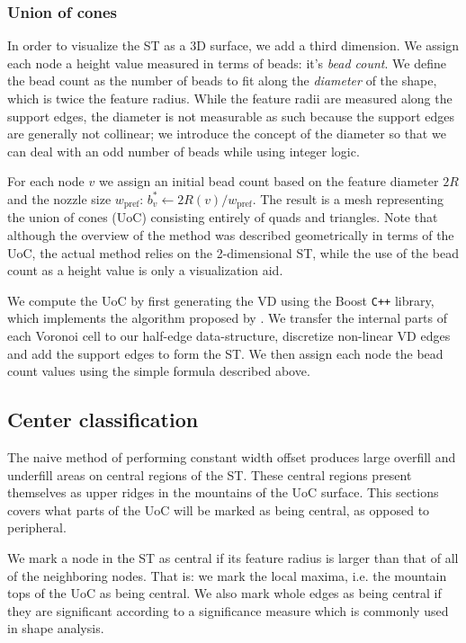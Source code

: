 \subsubsection{Union of cones}
In order to visualize the ST as a 3D surface, we add a third dimension.
We assign each node a height value measured in terms of beads: it's \emph{bead count}.
We define the bead count as the number of beads to fit along the \emph{diameter} of the shape, which is twice the feature radius.
While the feature radii are measured along the support edges, the diameter is not measurable as such because the support edges are generally not collinear;
we introduce the concept of the diameter so that we can deal with an odd number of beads while using integer logic.

For each node $v$ we assign an initial bead count based on the feature diameter $2R$ and the nozzle size $w_\text{pref}$: $b^*_v \leftarrow 2 R(v) / w_\text{pref}$.
The result is a mesh representing the union of cones (UoC) consisting entirely of quads and triangles.
Note that although the overview of the method was described geometrically in terms of the UoC, the actual method relies on the 2-dimensional ST, while the use of the bead count as a height value is only a visualization aid.

We compute the UoC by first generating the VD using the Boost \verb!C++! library, which implements the algorithm proposed by \citeauthor{fortune1986sascg}.\cite{fortune1986sascg}
We transfer the internal parts of each Voronoi cell to our half-edge data-structure, discretize non-linear VD edges and add the support edges to form the ST.
We then assign each node the bead count values using the simple formula described above.












\subsection{Center classification}\label{sec_center_classification}
The naive method of performing constant width offset produces large overfill and underfill areas on central regions of the ST.
These central regions present themselves as upper ridges in the mountains of the UoC surface.
This sections covers what parts of the UoC will be marked as being central, as opposed to peripheral.

We mark a node in the ST as central if its feature radius is larger than that of all of the neighboring nodes.
That is: we mark the local maxima, i.e. the mountain tops of the UoC as being central.
We also mark whole edges as being central if they are significant according to a significance measure which is commonly used in shape analysis.


